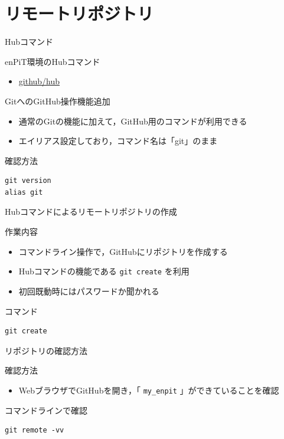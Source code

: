 \documentclass[t, aspectratio=169]{beamer}
\begin{document}
\section{リモートリポジトリ}
\label{sec-2-2}
\begin{frame}[fragile,label=sec-2-2-1]{Hubコマンド}
 \begin{block}{enPiT環境のHubコマンド}
\begin{itemize}
\item \href{https://github.com/github/hub}{github/hub}
\end{itemize}
\end{block}
\begin{block}{GitへのGitHub操作機能追加}
\begin{itemize}
\item 通常のGitの機能に加えて，GitHub用のコマンドが利用できる
\item エイリアス設定しており，コマンド名は「git」のまま
\end{itemize}
\end{block}
\begin{block}{確認方法}
\begin{verbatim}
git version
alias git
\end{verbatim}
\end{block}
\end{frame}

\begin{frame}[fragile,label=sec-2-2-2]{Hubコマンドによるリモートリポジトリの作成}
 \begin{block}{作業内容}
\begin{itemize}
\item コマンドライン操作で，GitHubにリポジトリを作成する
\item Hubコマンドの機能である \texttt{git create} を利用
\item 初回既動時にはパスワードか聞かれる
\end{itemize}
\end{block}
\begin{block}{コマンド}
\begin{verbatim}
git create
\end{verbatim}
\end{block}
\end{frame}

\begin{frame}[fragile,label=sec-2-2-3]{リポジトリの確認方法}
 \begin{block}{確認方法}
\begin{itemize}
\item WebブラウザでGitHubを開き，「 \texttt{my\_enpit} 」ができていることを確認
\end{itemize}
\end{block}
\begin{block}{コマンドラインで確認}
\begin{verbatim}
git remote -vv
\end{verbatim}
\end{block}
\end{frame}
\end{document}
